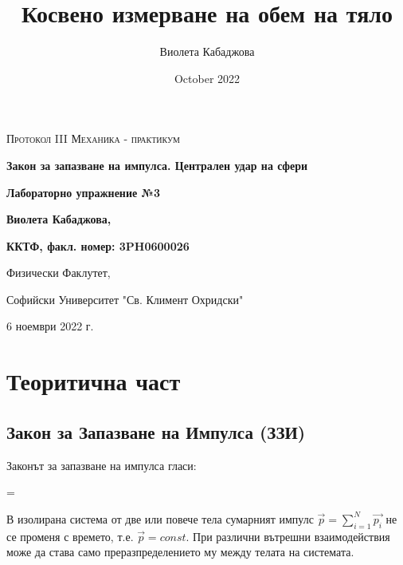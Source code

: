 \documentclass[12pt]{article}
\title{Косвено измерване на обем на тяло}
\author{Виолета Кабаджова}
\date{October 2022}
\newenvironment{warning}
  {\par\begin{mdframed}[linewidth=2pt, linecolor=white]%
    \begin{list}{}{\leftmargin=1cm
                   \labelwidth=\leftmargin}\item[\Large\ding{43}]}
  {\end{list}\end{mdframed}\par}
\begin{document}
\begin{titlepage}
	\flushleft
	{\scshape\Large Протокол III \hspace{2cm} Механика - практикум\par}
	\vspace{5cm}
	{\huge\bfseries Закон за запазване на импулса. Централен удар на сфери\par}
	\vspace{1cm}
	{\LARGE\bfseries Лабораторно упражнение №3\par}
	\vspace{5cm}
    {\LARGE\bfseries Виолета Кабаджова, \par}
    {\large\bfseries ККТФ, факл. номер: 3PH0600026\par}
	\vspace{1cm}
	
	{\large Физически Факлутет, 
	
	Софийски Университет "Св. Климент Охридски"
	
	6 ноември 2022 г.\par}
	
\end{titlepage}

\section{Теоритична част}
\subsection{Закон за Запазване на Импулса (ЗЗИ)}
Законът за запазване на импулса гласи: 
\begin{warning}
В изолирана система от две или повече тела сумарният импулс \(\vec{p} = \sum_{i=1}^{N}{\vec{p_i}}\) не се променя с времето, т.е. \(\vec{p} = const\). При различни вътрешни взаимодействия може да става само преразпределението му между телата на системата.
\end{warning}
\end{document}
